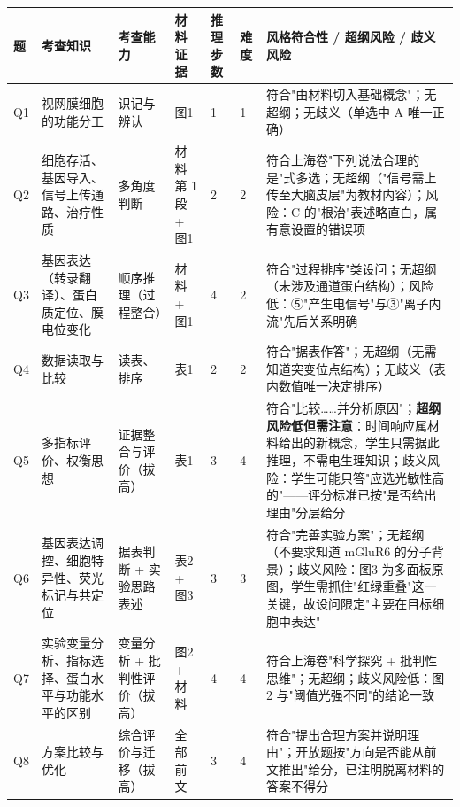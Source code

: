 \documentclass[UTF8,a4paper,11pt]{ctexart}
\begin{document}
\begin{longtable}{@{}p{0.9cm}p{2.5cm}p{2.4cm}p{3.0cm}p{1.0cm}p{0.9cm}p{3.6cm}@{}}
\toprule
\textbf{题} & \textbf{考查知识} & \textbf{考查能力} & \textbf{材料证据} & \textbf{推理步数} & \textbf{难度} & \textbf{风格符合性 / 超纲风险 / 歧义风险} \\
\midrule
\endhead
Q1 & 视网膜细胞的功能分工 & 识记与辨认 & 图1 & 1 & 1 & 符合"由材料切入基础概念"；无超纲；无歧义（单选中 A 唯一正确） \\
\addlinespace
Q2 & 细胞存活、基因导入、信号上传通路、治疗性质 & 多角度判断 & 材料第 1 段 + 图1 & 2 & 2 & 符合上海卷"下列说法合理的是"式多选；无超纲（"信号需上传至大脑皮层"为教材内容）；风险：C 的"根治"表述略直白，属有意设置的错误项 \\
\addlinespace
Q3 & 基因表达（转录翻译）、蛋白质定位、膜电位变化 & 顺序推理（过程整合） & 材料 + 图1 & 4 & 2 & 符合"过程排序"类设问；无超纲（未涉及通道蛋白结构）；风险低：⑤"产生电信号"与③"离子内流"先后关系明确 \\
\addlinespace
Q4 & 数据读取与比较 & 读表、排序 & 表1 & 2 & 2 & 符合"据表作答"；无超纲（无需知道突变位点结构）；无歧义（表内数值唯一决定排序） \\
\addlinespace
Q5 & 多指标评价、权衡思想 & 证据整合与评价（拔高） & 表1 & 3 & 4 & 符合"比较……并分析原因"；\textbf{超纲风险低但需注意}：时间响应属材料给出的新概念，学生只需据此推理，不需电生理知识；歧义风险：学生可能只答"应选光敏性高的"——评分标准已按"是否给出理由"分层给分 \\
\addlinespace
Q6 & 基因表达调控、细胞特异性、荧光标记与共定位 & 据表判断 + 实验思路表述 & 表2 + 图3 & 3 & 3 & 符合"完善实验方案"；无超纲（不要求知道 mGluR6 的分子背景）；歧义风险：图3 为多面板原图，学生需抓住"红绿重叠"这一关键，故设问限定"主要在目标细胞中表达" \\
\addlinespace
Q7 & 实验变量分析、指标选择、蛋白水平与功能水平的区别 & 变量分析 + 批判性评价（拔高） & 图2 + 材料 & 4 & 4 & 符合上海卷"科学探究 + 批判性思维"；无超纲；歧义风险低：图2 与"阈值光强不同"的结论一致 \\
\addlinespace
Q8 & 方案比较与优化 & 综合评价与迁移（拔高） & 全部前文 & 3 & 4 & 符合"提出合理方案并说明理由"；开放题按"方向是否能从前文推出"给分，已注明脱离材料的答案不得分 \\
\bottomrule
\end{longtable}
\end{document}
